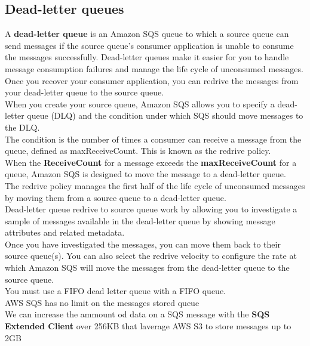 \documentclass[12pt, letterpaper, twoside]{article}
\begin{document}
\subsection{Dead-letter queues}
A \textbf{dead-letter queue} is an Amazon SQS queue to which a source queue can send messages if the source queue’s 
consumer application is unable to consume the messages successfully. Dead-letter queues make it easier for you to 
handle message consumption failures and manage the life cycle of unconsumed messages.\\
Once you recover your consumer application, you can redrive the messages from your dead-letter queue to the 
source queue.\\

When you create your source queue, Amazon SQS allows you to specify a dead-letter queue (DLQ) and the condition 
under which SQS should move messages to the DLQ.\\
The condition is the number of times a consumer can receive a message from the queue, defined as maxReceiveCount.
This is known as the redrive policy.\\

When the \textbf{ReceiveCount} for a message exceeds the \textbf{maxReceiveCount} for a queue, Amazon SQS is 
designed to move the message to a dead-letter queue.\\
The redrive policy manages the first half of the life cycle of unconsumed messages by moving them from a source queue 
to a dead-letter queue.\\

Dead-letter queue redrive to source queue work by allowing you to investigate a sample of messages available in the 
dead-letter queue by showing message attributes and related metadata.\\
Once you have investigated the messages, you can move them back to their source queue(s). You can also select the 
redrive velocity to configure the rate at which Amazon SQS will move the messages from the dead-letter queue to 
the source queue.\\

You must use a FIFO dead letter queue with a FIFO queue.\\

AWS SQS has no limit on the messages stored queue\\

We can increase the ammount od data on a SQS message with the \textbf{SQS Extended Client} over 256KB that laverage
AWS S3 to store messages up to 2GB \\
\end{document}
